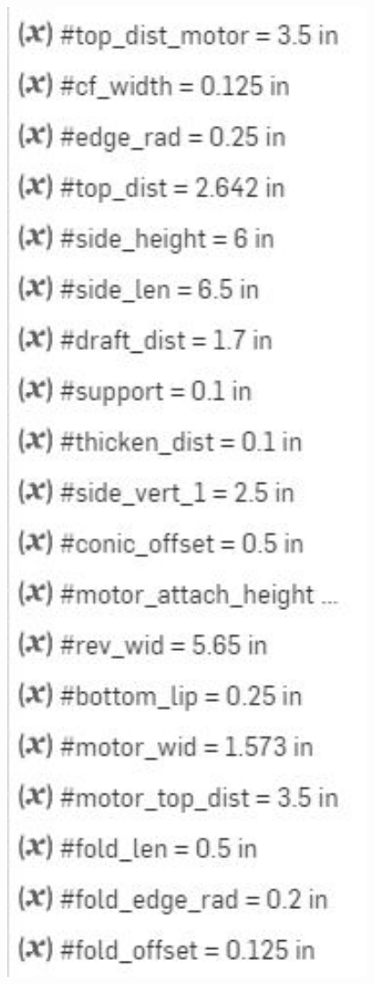  

\begin{figure}[ht]
\centering
\begin{minipage}[b]{.48\textwidth}
  \centering
  \includegraphics[width=0.95\textwidth]{Meetings/November/11-28-21/11-28-21_CAD_Figure1 - Nathan Forrer.JPG}

\end{minipage}
\end{figure}
